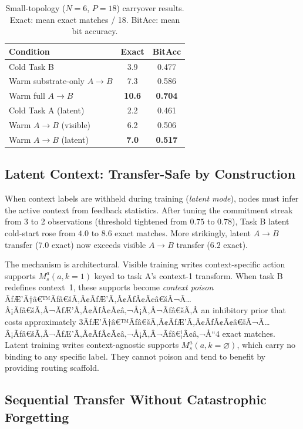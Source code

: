 \documentclass[10pt,twocolumn]{article}
\newcommand{\Ms}{M_s}
\begin{document}
\begin{table}[t]
\centering
\caption{Small-topology ($N=6$, $P=18$) carryover results.
  Exact: mean exact matches / 18. BitAcc: mean bit accuracy.}
\label{tab:transfer_small}
\small
\begin{tabular}{lcc}
\toprule
Condition & Exact & BitAcc \\
\midrule
Cold Task B                    & 3.9  & 0.477 \\
Warm substrate-only $A\to B$   & 7.3  & 0.586 \\
Warm full $A\to B$             & \textbf{10.6} & \textbf{0.704} \\
\midrule
Cold Task A (latent)           & 2.2  & 0.461 \\
Warm $A\to B$ (visible)        & 6.2  & 0.506 \\
Warm $A\to B$ (latent)         & \textbf{7.0}  & \textbf{0.517} \\
\bottomrule
\end{tabular}
\end{table}

\subsection{Latent Context: Transfer-Safe by Construction}
\label{sec:latent}

When context labels are withheld during training (\emph{latent mode}),
nodes must infer the active context from feedback statistics.
After tuning the commitment streak from 3 to 2 observations
(threshold tightened from $0.75$ to $0.78$), Task B latent cold-start
rose from $4.0$ to $8.6$ exact matches.
More strikingly, latent $A \to B$ transfer ($7.0$ exact) now exceeds
visible $A \to B$ transfer ($6.2$ exact).

The mechanism is architectural.
Visible training writes context-specific action supports
$\Ms^a(a, k\!=\!1)$ keyed to task A's context-1 transform.
When task B redefines context~1, these supports become \emph{context poison}
ÃƒÆ’Ã†â€™Ãƒâ€šÃ‚Â¢ÃƒÆ’Ã‚Â¢ÃƒÂ¢Ã¢â€šÂ¬Ã…Â¡Ãƒâ€šÃ‚Â¬ÃƒÆ’Ã‚Â¢ÃƒÂ¢Ã¢â‚¬Å¡Ã‚Â¬Ãƒâ€šÃ‚Â an inhibitory prior that costs approximately $3$ÃƒÆ’Ã†â€™Ãƒâ€šÃ‚Â¢ÃƒÆ’Ã‚Â¢ÃƒÂ¢Ã¢â€šÂ¬Ã…Â¡Ãƒâ€šÃ‚Â¬ÃƒÆ’Ã‚Â¢ÃƒÂ¢Ã¢â‚¬Å¡Ã‚Â¬Ãƒâ€¦Ã¢â‚¬Å“$4$ exact matches.
Latent training writes context-agnostic supports
$\Ms^a(a, k\!=\!\varnothing)$, which carry no binding to any specific label.
They cannot poison and tend to benefit by providing routing scaffold.

\subsection{Sequential Transfer Without Catastrophic Forgetting}
\label{sec:sequential}
\end{document}
